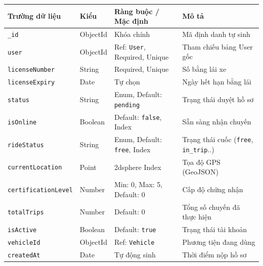 \documentclass[../DoAn.tex]{subfiles}
\begin{document}
\begin{table}[H]
    \centering
    \begin{tabular}{|l|l|p{4cm}|p{5cm}|}
        \hline
        \textbf{Trường dữ liệu}     & \textbf{Kiểu} & \textbf{Ràng buộc / Mặc định}        & \textbf{Mô tả}                                       \\ \hline
        \texttt{\_id}               & ObjectId      & Khóa chính                           & Mã định danh tự sinh                                 \\ \hline
        \texttt{user}               & ObjectId      & Ref: \texttt{User}, Required, Unique & Tham chiếu bảng User gốc                             \\ \hline
        \texttt{licenseNumber}      & String        & Required, Unique                     & Số bằng lái xe                                       \\ \hline
        \texttt{licenseExpiry}      & Date          & Tự chọn                              & Ngày hết hạn bằng lái                                \\ \hline
        \texttt{status}             & String        & Enum, Default: \texttt{pending}      & Trạng thái duyệt hồ sơ                               \\ \hline
        \texttt{isOnline}           & Boolean       & Default: \texttt{false}, Index       & Sẵn sàng nhận chuyến                                 \\ \hline
        \texttt{rideStatus}         & String        & Enum, Default: \texttt{free}, Index  & Trạng thái cuốc (\texttt{free}, \texttt{in\_trip}..) \\ \hline
        \texttt{currentLocation}    & Point         & 2dsphere Index                       & Tọa độ GPS (GeoJSON)                                 \\ \hline
        \texttt{certificationLevel} & Number        & Min: 0, Max: 5, Default: 0           & Cấp độ chứng nhận                                    \\ \hline
        \texttt{totalTrips}         & Number        & Default: 0                           & Tổng số chuyến đã thực hiện                          \\ \hline
        \texttt{isActive}           & Boolean       & Default: \texttt{true}               & Trạng thái tài khoản                                 \\ \hline
        \texttt{vehicleId}          & ObjectId      & Ref: \texttt{Vehicle}                & Phương tiện đang dùng                                \\ \hline
        \texttt{createdAt}          & Date          & Tự động sinh                         & Thời điểm nộp hồ sơ                                  \\ \hline
    \end{tabular}
\end{table}
\end{document}
